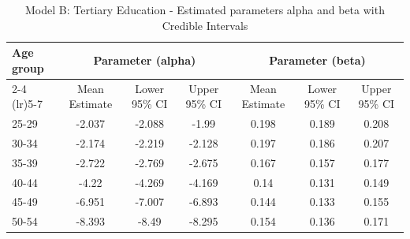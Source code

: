 \begin{landscape}
\begin{table}[htbp]
\centering
\caption{Model B: Tertiary Education - Estimated parameters alpha and beta  with Credible Intervals}
\label{tab:Fparameters_ab8}
\begin{tabular}{@{}lcccccc@{}}
\toprule
Age group & \multicolumn{3}{c}{Parameter (alpha)} & \multicolumn{3}{c}{Parameter (beta)} \\ 
\cmidrule(lr){2-4} \cmidrule(lr){5-7}
          & Mean Estimate & Lower 95\% CI & Upper 95\% CI & Mean Estimate & Lower 95\% CI & Upper 95\% CI \\ 
\midrule
25-29 & -2.037 & -2.088 & -1.99 & 0.198 & 0.189 & 0.208 \\
30-34 & -2.174 & -2.219 & -2.128 & 0.197 & 0.186 & 0.207 \\
35-39 & -2.722 & -2.769 & -2.675 & 0.167 & 0.157 & 0.177 \\
40-44 & -4.22 & -4.269 & -4.169 & 0.14 & 0.131 & 0.149 \\
45-49 & -6.951 & -7.007 & -6.893 & 0.144 & 0.133 & 0.155 \\
50-54 & -8.393 & -8.49 & -8.295 & 0.154 & 0.136 & 0.171 \\
\bottomrule
\end{tabular}
\end{table}
\end{landscape}